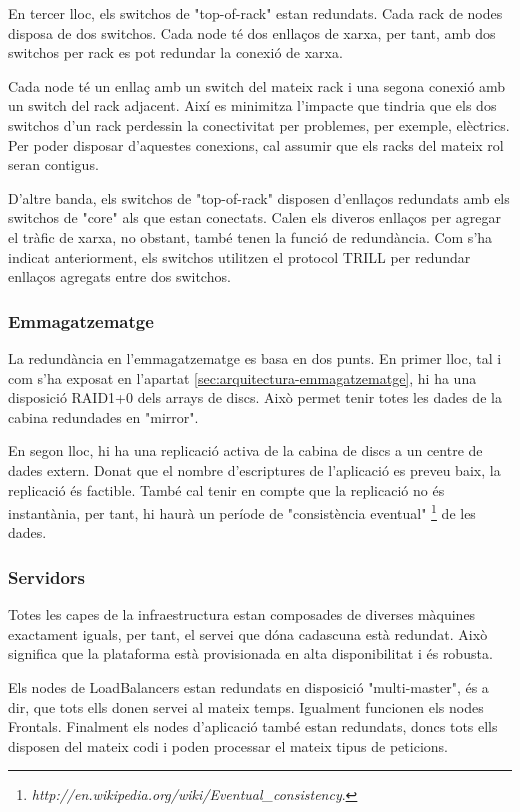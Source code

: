     En tercer lloc, els switchos de "top-of-rack" estan redundats. Cada rack de nodes disposa de dos switchos. Cada node té dos enllaços de xarxa, per tant, amb dos switchos per rack es pot redundar la conexió de xarxa.
    
    Cada node té un enllaç amb un switch del mateix rack i una segona conexió amb un switch del rack adjacent. Així es minimitza l'impacte que tindria que els dos switchos d'un rack perdessin la conectivitat per problemes, per exemple, elèctrics. Per poder disposar d'aquestes conexions, cal assumir que els racks del mateix rol seran contigus. 

    
    D'altre banda, els switchos de "top-of-rack" disposen d'enllaços redundats amb els switchos de "core" als que estan conectats. Calen els diveros enllaços per agregar el tràfic de xarxa, no obstant, també tenen la funció de redundància. Com s'ha indicat anteriorment, els switchos utilitzen el protocol TRILL per redundar enllaços agregats entre dos switchos.
    
    
\subsubsection{Emmagatzematge}

La redundància en l'emmagatzematge es basa en dos punts. En primer lloc, tal i com s'ha exposat en l'apartat \ref{sec:arquitectura-emmagatzematge}, hi ha una disposició RAID1+0 dels arrays de discs. Això permet tenir totes les dades de la cabina redundades en "mirror".

En segon lloc, hi ha una replicació activa de la cabina de discs a un centre de dades extern. Donat que el nombre d'escriptures de l'aplicació es preveu baix, la replicació és factible. També cal tenir en compte que la replicació no és instantània, per tant, hi haurà un període de "consistència eventual" \footnote{\textit{http://en.wikipedia.org/wiki/Eventual\_consistency}.} de les dades. 

\subsubsection{Servidors}
Totes les capes de la infraestructura estan composades de diverses màquines exactament iguals, per tant, el servei que dóna cadascuna està redundat. Això significa que la plataforma està provisionada en alta disponibilitat i és robusta.

Els nodes de LoadBalancers estan redundats en disposició "multi-master", és a dir, que tots ells donen servei al mateix temps. Igualment funcionen els nodes Frontals. Finalment els nodes d'aplicació també estan redundats, doncs tots ells disposen del mateix codi i poden processar el mateix tipus de peticions.
